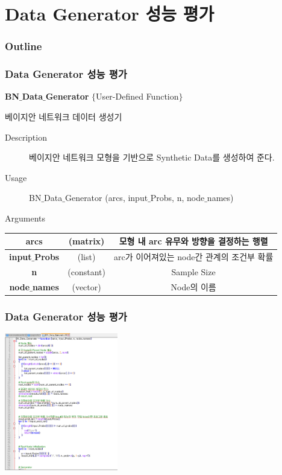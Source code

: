 \documentclass{beamer}
\begin{document}
\section{Data Generator 성능 평가}
\begin{frame}
\frametitle{Outline}
{\scriptsize{}
	\tableofcontents[currentsection]
}
\end{frame}


\begin{frame}
\frametitle{Data Generator 성능 평가}

{\scriptsize{}
	\textbf{BN$\_$Data$\_$Generator} $\{$User-Defined Function$\}$

	\begin{center}	
		베이지안 네트워크 데이터 생성기
	\end{center}
	
	\begin{description}
		\item[Description] 베이지안 네트워크 모형을 기반으로 Synthetic Data를 생성하여 준다.
		
		\item[Usage] BN$\_$Data$\_$Generator (arcs, input$\_$Probs, n, node$\_$names)
		
		\item[Arguments]
	\end{description}
	
	\begin{center}
				\begin{tabular}{c|c|c}
					\hline 
					\textbf{arcs} & (matrix) & 모형 내 arc 유무와 방향을 결정하는 행렬\tabularnewline
					\hline 
					\textbf{input$\_$Probs} & (list) & arc가 이어져있는 node간 관계의 조건부 확률\tabularnewline
					\hline 
					\textbf{n} & (constant) & Sample Size\tabularnewline
					\hline 
					\textbf{node$\_$names} & (vector) & Node의 이름\tabularnewline
					\hline 
				\end{tabular}
	\end{center}
}
\end{frame}


\begin{frame}
\frametitle{Data Generator 성능 평가}

{\scriptsize{}
	\begin{center}
		\includegraphics[height=170pt]{images/image22}
	\end{center}
}
\end{frame}
\end{document}
